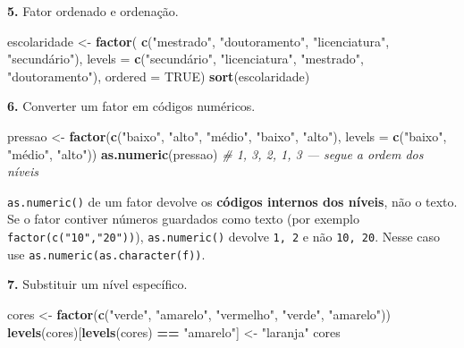 \documentclass[
  portuguese,
  11pt,
  openany]{book}
\newenvironment{Shaded}{\begin{snugshade}}{\end{snugshade}}
\newcommand{\AttributeTok}[1]{\textcolor[rgb]{0.13,0.29,0.53}{#1}}
\newcommand{\CommentTok}[1]{\textcolor[rgb]{0.56,0.35,0.01}{\textit{#1}}}
\newcommand{\ConstantTok}[1]{\textcolor[rgb]{0.56,0.35,0.01}{#1}}
\newcommand{\FunctionTok}[1]{\textcolor[rgb]{0.13,0.29,0.53}{\textbf{#1}}}
\newcommand{\NormalTok}[1]{#1}
\newcommand{\OtherTok}[1]{\textcolor[rgb]{0.56,0.35,0.01}{#1}}
\newcommand{\SpecialCharTok}[1]{\textcolor[rgb]{0.81,0.36,0.00}{\textbf{#1}}}
\newcommand{\StringTok}[1]{\textcolor[rgb]{0.31,0.60,0.02}{#1}}
\begin{document}
\textbf{5.} Fator ordenado e ordenação.

\begin{Shaded}
\begin{Highlighting}[]
\NormalTok{escolaridade }\OtherTok{\textless{}{-}} \FunctionTok{factor}\NormalTok{(}
  \FunctionTok{c}\NormalTok{(}\StringTok{"mestrado"}\NormalTok{, }\StringTok{"doutoramento"}\NormalTok{, }\StringTok{"licenciatura"}\NormalTok{, }\StringTok{"secundário"}\NormalTok{),}
  \AttributeTok{levels =} \FunctionTok{c}\NormalTok{(}\StringTok{"secundário"}\NormalTok{, }\StringTok{"licenciatura"}\NormalTok{, }\StringTok{"mestrado"}\NormalTok{, }\StringTok{"doutoramento"}\NormalTok{),}
  \AttributeTok{ordered =} \ConstantTok{TRUE}\NormalTok{)}
\FunctionTok{sort}\NormalTok{(escolaridade)}
\end{Highlighting}
\end{Shaded}

\textbf{6.} Converter um fator em códigos numéricos.

\begin{Shaded}
\begin{Highlighting}[]
\NormalTok{pressao }\OtherTok{\textless{}{-}} \FunctionTok{factor}\NormalTok{(}\FunctionTok{c}\NormalTok{(}\StringTok{"baixo"}\NormalTok{, }\StringTok{"alto"}\NormalTok{, }\StringTok{"médio"}\NormalTok{, }\StringTok{"baixo"}\NormalTok{, }\StringTok{"alto"}\NormalTok{),}
                  \AttributeTok{levels =} \FunctionTok{c}\NormalTok{(}\StringTok{"baixo"}\NormalTok{, }\StringTok{"médio"}\NormalTok{, }\StringTok{"alto"}\NormalTok{))}
\FunctionTok{as.numeric}\NormalTok{(pressao)   }\CommentTok{\# 1, 3, 2, 1, 3 — segue a ordem dos níveis}
\end{Highlighting}
\end{Shaded}

\texttt{as.numeric()} de um fator devolve os \textbf{códigos internos dos níveis}, não o
texto. Se o fator contiver números guardados como texto (por exemplo
\texttt{factor(c("10","20"))}), \texttt{as.numeric()} devolve \texttt{1,\ 2} e não \texttt{10,\ 20}. Nesse
caso use \texttt{as.numeric(as.character(f))}.

\textbf{7.} Substituir um nível específico.

\begin{Shaded}
\begin{Highlighting}[]
\NormalTok{cores }\OtherTok{\textless{}{-}} \FunctionTok{factor}\NormalTok{(}\FunctionTok{c}\NormalTok{(}\StringTok{"verde"}\NormalTok{, }\StringTok{"amarelo"}\NormalTok{, }\StringTok{"vermelho"}\NormalTok{, }\StringTok{"verde"}\NormalTok{, }\StringTok{"amarelo"}\NormalTok{))}
\FunctionTok{levels}\NormalTok{(cores)[}\FunctionTok{levels}\NormalTok{(cores) }\SpecialCharTok{==} \StringTok{"amarelo"}\NormalTok{] }\OtherTok{\textless{}{-}} \StringTok{"laranja"}
\NormalTok{cores}
\end{Highlighting}
\end{Shaded}
\end{document}
